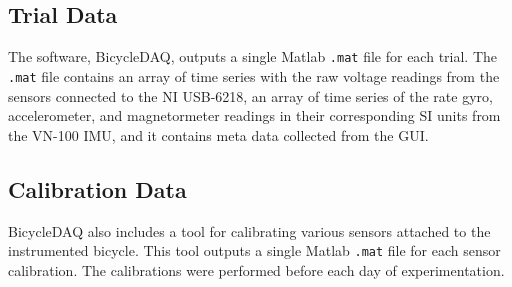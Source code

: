 \documentclass{article}
\begin{document}
\subsection{Trial Data}

The software, BicycleDAQ, outputs a single Matlab \verb|.mat| file for each
trial. The \verb|.mat| file contains an array of time series with the raw
voltage readings from the sensors connected to the NI USB-6218, an array of
time series of the rate gyro, accelerometer, and magnetormeter readings in
their corresponding SI units from the VN-100 IMU, and it contains meta data
collected from the GUI.

\subsection{Calibration Data}

BicycleDAQ also includes a tool for calibrating various sensors attached to the
instrumented bicycle. This tool outputs a single Matlab \verb|.mat| file for
each sensor calibration. The calibrations were performed before each day of
experimentation.
\end{document}
